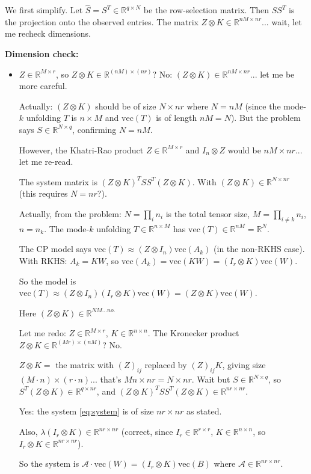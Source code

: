 \documentclass[12pt]{article}
\begin{document}
We first simplify. Let $\hat{S} = S^T \in \mathbb{R}^{q \times N}$ be the row-selection matrix. Then $SS^T$ is the projection onto the observed entries. The matrix $Z \otimes K \in \mathbb{R}^{nM \times nr}$... wait, let me recheck dimensions.

\textbf{Dimension check:}
\begin{itemize}
\item $Z \in \mathbb{R}^{M \times r}$, so $Z \otimes K \in \mathbb{R}^{(nM) \times (nr)}$? No: $(Z \otimes K) \in \mathbb{R}^{nM \times nr}$... let me be more careful.

Actually: $(Z \otimes K)$ should be of size $N \times nr$ where $N = nM$ (since the mode-$k$ unfolding $T$ is $n \times M$ and $\mathrm{vec}(T)$ is of length $nM = N$). But the problem says $S \in \mathbb{R}^{N \times q}$, confirming $N = nM$.

However, the Khatri-Rao product $Z \in \mathbb{R}^{M \times r}$ and $I_n \otimes Z$ would be $nM \times nr$... let me re-read.

The system matrix is $(Z \otimes K)^T S S^T (Z \otimes K)$. With $(Z \otimes K) \in \mathbb{R}^{N \times nr}$ (this requires $N = nr$?).

Actually, from the problem: $N = \prod_i n_i$ is the total tensor size, $M = \prod_{i \neq k} n_i$, $n = n_k$. The mode-$k$ unfolding $T \in \mathbb{R}^{n \times M}$ has $\mathrm{vec}(T) \in \mathbb{R}^{nM} = \mathbb{R}^N$.

The CP model says $\mathrm{vec}(T) \approx (Z \otimes I_n) \mathrm{vec}(A_k)$ (in the non-RKHS case). With RKHS: $A_k = KW$, so $\mathrm{vec}(A_k) = \mathrm{vec}(KW) = (I_r \otimes K)\mathrm{vec}(W)$.

So the model is $\mathrm{vec}(T) \approx (Z \otimes I_n)(I_r \otimes K)\mathrm{vec}(W) = (Z \otimes K)\mathrm{vec}(W)$.

Here $(Z \otimes K) \in \mathbb{R}^{NM... no.}$

Let me redo: $Z \in \mathbb{R}^{M \times r}$, $K \in \mathbb{R}^{n \times n}$. The Kronecker product $Z \otimes K \in \mathbb{R}^{(Mr) \times (nM)}$? No.

$Z \otimes K = $ the matrix with $(Z)_{ij}$ replaced by $(Z)_{ij} K$, giving size $(M \cdot n) \times (r \cdot n)$... that's $Mn \times nr = N \times nr$. Wait but $S \in \mathbb{R}^{N \times q}$, so $S^T(Z \otimes K) \in \mathbb{R}^{q \times nr}$, and $(Z\otimes K)^T S S^T (Z\otimes K) \in \mathbb{R}^{nr \times nr}$.

Yes: the system \eqref{eq:system} is of size $nr \times nr$ as stated.

Also, $\lambda(I_r \otimes K) \in \mathbb{R}^{nr \times nr}$ (correct, since $I_r \in \mathbb{R}^{r\times r}$, $K \in \mathbb{R}^{n\times n}$, so $I_r \otimes K \in \mathbb{R}^{nr \times nr}$).

So the system is $\mathcal{A} \cdot \mathrm{vec}(W) = (I_r \otimes K)\mathrm{vec}(B)$ where $\mathcal{A} \in \mathbb{R}^{nr \times nr}$.
\end{itemize}
\end{document}
